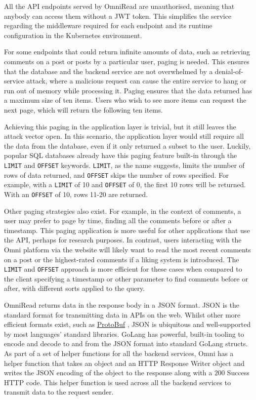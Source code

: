 All the API endpoints served by OmniRead are unauthorised, meaning that anybody can access them without a JWT token. This simplifies the service regarding the middleware required for each endpoint and its runtime configuration in the Kubernetes environment. 

For some endpoints that could return infinite amounts of data, such as retrieving comments on a post or posts by a particular user, paging is needed.
This ensures that the database and the backend service are not overwhelmed by a denial-of-service attack, where a malicious request can cause the entire service to hang or run out of memory while processing it. 
Paging ensures that the data returned has a maximum size of ten items. Users who wish to see more items can request the next page, which will return the following ten items.

Achieving this paging in the application layer is trivial, but it still leaves the attack vector open. In this scenario, the application layer would still require all the data from the database, even if it only returned a subset to the user. 
Luckily, popular SQL databases already have this paging feature built-in through the \verb|LIMIT| and \verb|OFFSET| keywords.
\verb|LIMIT|, as the name suggests, limits the number of rows of data returned, and \verb|OFFSET| skips the number of rows specified.
For example, with a \verb|LIMIT| of 10 and \verb|OFFSET| of 0, the first 10 rows will be returned. With an \verb|OFFSET| of 10, rows 11-20 are returned. 



Other paging strategies also exist. For example, in the context of comments, a user may prefer to page by time, finding all the comments before or after a timestamp.
This paging application is more useful for other applications that use the API, perhaps for research purposes.
In contrast, users interacting with the Omni platform via the website will likely want to read the most recent comments on a post or the highest-rated comments if a liking system is introduced.
The \verb|LIMIT| and \verb|OFFSET| approach is more efficient for these cases when compared to the client specifying a timestamp or other parameter to find comments before or after, with different sorts applied to the query. 

OmniRead returns data in the response body in a JSON format. JSON is the standard format for transmitting data in APIs on the web.
Whilst other more efficient formats exist, such as \underline{\href{https://protobuf.dev}{ProtoBuf}} \nocite{protobuf}, JSON is ubiquitous and well-supported by most languages' standard libraries.
GoLang has powerful, built-in tooling to encode and decode to and from the JSON format into standard GoLang structs.
As part of a set of helper functions for all the backend services, Omni has a helper function that takes an object and an HTTP Response Writer object and writes the JSON encoding of the object to the response along with a 200 Success HTTP code.
This helper function is used across all the backend services to transmit data to the request sender. 

